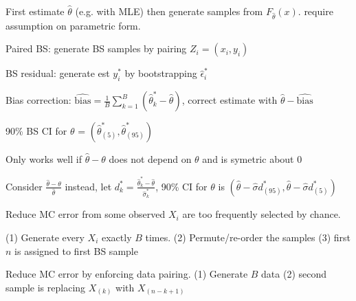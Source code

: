 \documentclass{article}
\renewcommand{\subsection}[1]{\text{\hl{[#1]}}}
\begin{document}
\subsection{Parametric}
First estimate $\hat\theta$ (e.g. with MLE) then generate samples from $F_{\hat\theta}(x)$. require assumption on parametric form.

\subsection{BS techniques}
Paired BS: generate BS samples by pairing $Z_i = (x_i, y_i)$

BS residual: generate est $y_i^*$ by bootstrapping $\hat\epsilon_i^*$

Bias correction: $\hat{\text{bias}} = \frac{1}{B}\sum_{k=1}^B (\hat\theta_k^* - \hat\theta)$, correct estimate with $\hat\theta - \hat{\text{bias}}$

\subsection{BS Percentile CI}
90\% BS CI for $\theta$ = $\left(\hat\theta^*_{(5)}, \hat\theta^*_{(95)}\right)$

Only works well if $\hat\theta - \theta$ does not depend on $\theta$ and is symetric about 0

\subsection{BS t CI}
Consider $\frac{\hat\theta - \theta}{\hat\theta}$ instead, let $d^*_k = \frac{\hat\theta_k^* - \hat\theta}{\hat\sigma^*_k}$,
90\% CI for $\theta$ is $(\hat\theta - \hat\sigma d^*_{(95)}, \hat\theta - \hat\sigma d^*_{(5)})$

\subsection{Balanced BS}
Reduce MC error from some observed $X_i$ are too frequently selected by chance.

(1) Generate every $X_i$ exactly $B$ times. (2) Permute/re-order the samples (3) first $n$ is assigned to first BS sample

\subsection{Antithetic BS}
Reduce MC error by enforcing data pairing.
(1) Generate $B$ data (2) second sample is replacing $X_{(k)}$ with $X_{(n-k+1)}$
\end{document}
